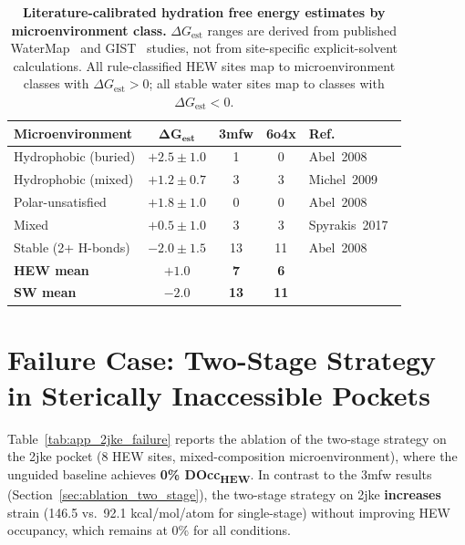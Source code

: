 \documentclass{article}
\begin{document}
\begin{table}[H]
  \centering
  \caption{\textbf{Literature-calibrated hydration free energy estimates
           by microenvironment class.}  $\Delta G_{\text{est}}$ ranges
           are derived from published WaterMap~\cite{abel2008} and
           GIST~\cite{nguyen2012gist} studies, not from site-specific
           explicit-solvent calculations.  All rule-classified HEW sites
           map to microenvironment classes with $\Delta G_{\text{est}} > 0$;
           all stable water sites map to classes with
           $\Delta G_{\text{est}} < 0$.}
  \label{tab:hew_thermo}
  \small
  \begin{tabular}{l c c c l}
    \toprule
    \textbf{Microenvironment} & $\bm{\Delta G_{\text{est}}}$ & \textbf{3mfw} & \textbf{6o4x} & \textbf{Ref.} \\
    \midrule
    Hydrophobic (buried)     & $+2.5 \pm 1.0$  & 1  & 0 & Abel~2008~\cite{abel2008} \\
    Hydrophobic (mixed)      & $+1.2 \pm 0.7$  & 3  & 3 & Michel~2009~\cite{michel2009} \\
    Polar-unsatisfied        & $+1.8 \pm 1.0$  & 0  & 0 & Abel~2008~\cite{abel2008} \\
    Mixed                    & $+0.5 \pm 1.0$  & 3  & 3 & Spyrakis~2017~\cite{spyrakis2017} \\
    Stable (2+ H-bonds)      & $-2.0 \pm 1.5$  & 13 & 11 & Abel~2008~\cite{abel2008} \\
    \midrule
    \textbf{HEW mean}        & $\mathbf{+1.0}$ & \textbf{7} & \textbf{6} & \\
    \textbf{SW mean}         & $\mathbf{-2.0}$ & \textbf{13} & \textbf{11} & \\
    \bottomrule
  \end{tabular}
\end{table}

\section{Failure Case: Two-Stage Strategy in Sterically Inaccessible Pockets}
\label{app:2jke_failure}

Table~\ref{tab:app_2jke_failure} reports the ablation of the two-stage strategy
on the 2jke pocket (8 HEW sites, mixed-composition microenvironment), where
the unguided baseline achieves \textbf{0\% DOcc\textsubscript{HEW}}.  In
contrast to the 3mfw results (Section~\ref{sec:ablation_two_stage}), the
two-stage strategy on 2jke \textbf{increases} strain (146.5 vs.\ 92.1
kcal/mol/atom for single-stage) without improving HEW occupancy, which
remains at 0\% for all conditions.
\end{document}
